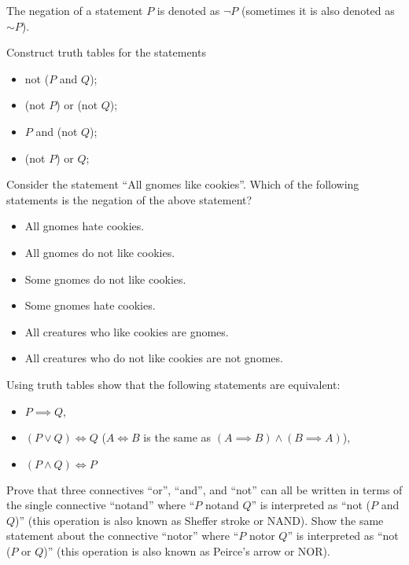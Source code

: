 The negation of a statement $P$ is denoted as $\lnot P$ (sometimes it is also
denoted as $\sim P$).



\begin{chapterendexercises}
  \exercise Construct truth tables for the statements
    \begin{itemize}
      \item not ($P$ and $Q$);
      \item (not $P$) or (not $Q$);
      \item $P$ and (not $Q$);
      \item (not $P$) or $Q$;
    \end{itemize}
  \exercise[recommended] Consider the statement ``All gnomes like cookies''. Which of
    the following statements is the negation of the above statement?
    \begin{itemize}
      \item All gnomes hate cookies.
      \item All gnomes do not like cookies.
      \item Some gnomes do not like cookies.
      \item Some gnomes hate cookies.
      \item All creatures who like cookies are gnomes.
      \item All creatures who do not like cookies are not gnomes.
    \end{itemize}
  \exercise Using truth tables show that the following statements are
    equivalent:
    \begin{itemize}
      \item $P \implies Q$,
      \item $(P \lor Q) \iff Q$
        ($A \iff B$ is the same as $(A \implies B) \land (B \implies A)$),
      \item $(P \land Q) \iff P$
    \end{itemize}
  \exercise Prove that three connectives ``or'', ``and'', and ``not'' can
    all be written in terms of the single connective ``notand'' where ``$P$
    notand $Q$'' is interpreted as ``not ($P$ and $Q$)'' (this operation is
    also known as Sheffer stroke or NAND).
  \exercise Show the same statement about the connective ``notor'' where
    ``$P$ notor $Q$'' is interpreted as ``not ($P$ or $Q$)'' (this operation is
    also known as Peirce's arrow or NOR).
\end{chapterendexercises}
